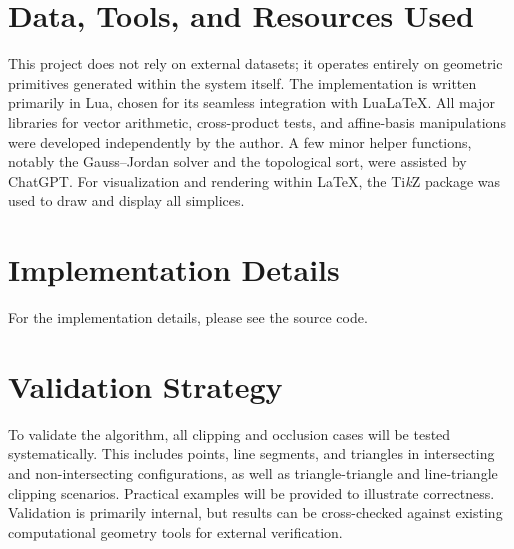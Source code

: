 \section{Data, Tools, and Resources Used}

This project does not rely on external datasets; it operates entirely on 
geometric primitives generated within the system itself. The implementation 
is written primarily in Lua, chosen for its seamless integration with Lua\LaTeX{}. 
All major libraries for vector arithmetic, cross-product tests, and 
affine-basis manipulations were developed independently by the author. 
A few minor helper functions, notably the Gauss--Jordan solver and the 
topological sort, were assisted by ChatGPT. For visualization and rendering 
within \LaTeX{}, the Ti\textit{k}Z package was used to draw and display all simplices.

\section{Implementation Details}

For the implementation details, please see the source code.

\section{Validation Strategy}

To validate the algorithm, all clipping and occlusion cases will be 
tested systematically. This includes points, line segments, and 
triangles in intersecting and non-intersecting configurations, as well 
as triangle-triangle and line-triangle clipping scenarios. Practical 
examples will be provided to illustrate correctness. Validation is 
primarily internal, but results can be cross-checked against 
existing computational geometry tools for external verification.


